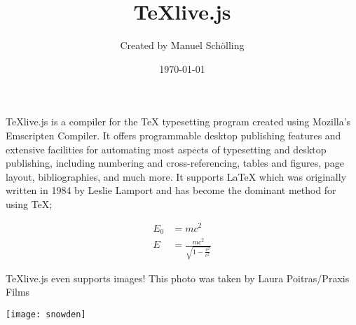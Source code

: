 \documentclass[12pt]{article}
\title{\TeX live.js}
\author{Created by Manuel Sch\"olling}
\date{\today}
\begin{document}
  \maketitle
  \TeX{}live.js is a compiler for the \TeX{}
  typesetting program created using Mozilla's Emscripten
  Compiler. It offers programmable desktop
  publishing features and extensive facilities for
  automating most aspects of typesetting and desktop
  publishing, including numbering and cross-referencing,
  tables and figures, page layout, bibliographies, and
  much more. It supports \LaTeX{} which was originally written 
  in 1984 by Leslie Lamport and has become the dominant method for
  using \TeX;
 
  \begin{align}
    E_0 &= mc^2                              \\
    E &= \frac{mc^2}{\sqrt{1-\frac{v^2}{c^2}}}
  \end{align}


  \TeX{}live.js even supports images! This photo was taken by Laura Poitras/Praxis Films

  \texttt{[image: snowden]}
\end{document}
